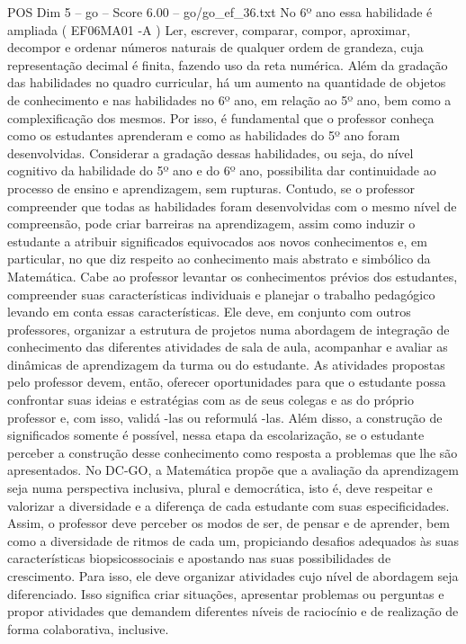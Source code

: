 \begin{textsample}{POS Dim 5 – go – Score 6.00 – go/go\_ef\_36.txt}
No 6º ano essa habilidade é ampliada ( EF06MA01 -A ) Ler, escrever, comparar, compor, aproximar, decompor e ordenar números naturais de qualquer ordem de grandeza, cuja representação decimal é finita, fazendo uso da reta numérica.
Além da gradação das habilidades no quadro curricular, há um aumento na quantidade de objetos de conhecimento e nas habilidades no 6º ano, em relação ao 5º ano, bem como a complexificação dos mesmos.
Por isso, é fundamental que o professor conheça como os estudantes aprenderam e como as habilidades do 5º ano foram desenvolvidas.
Considerar a gradação dessas habilidades, ou seja, do nível cognitivo da habilidade do 5º ano e do 6º ano, possibilita dar continuidade ao processo de ensino e aprendizagem, sem rupturas.
Contudo, se o professor compreender que todas as habilidades foram desenvolvidas com o mesmo nível de compreensão, pode criar barreiras na aprendizagem, assim como induzir o estudante a atribuir significados equivocados aos novos conhecimentos e, em particular, no que diz respeito ao conhecimento mais abstrato e simbólico da Matemática.
Cabe ao professor levantar os conhecimentos prévios dos estudantes, compreender suas características individuais e planejar o trabalho pedagógico levando em conta essas características.
Ele deve, em conjunto com outros professores, organizar a estrutura de projetos numa abordagem de integração de conhecimento das diferentes atividades de sala de aula, acompanhar e avaliar as dinâmicas de aprendizagem da turma ou do estudante.
As atividades propostas pelo professor devem, então, oferecer oportunidades para que o estudante possa confrontar suas ideias e estratégias com as de seus colegas e as do próprio professor e, com isso, validá -las ou reformulá -las.
Além disso, a construção de significados somente é possível, nessa etapa da escolarização, se o estudante perceber a construção desse conhecimento como resposta a problemas que lhe são apresentados.
No DC-GO, a Matemática propõe que a avaliação da aprendizagem seja numa perspectiva inclusiva, plural e democrática, isto é, deve respeitar e valorizar a diversidade e a diferença de cada estudante com suas especificidades.
Assim, o professor deve perceber os modos de ser, de pensar e de aprender, bem como a diversidade de ritmos de cada um, propiciando desafios adequados às suas características biopsicossociais e apostando nas suas possibilidades de crescimento.
Para isso, ele deve organizar atividades cujo nível de abordagem seja diferenciado.
Isso significa criar situações, apresentar problemas ou perguntas e propor atividades que demandem diferentes níveis de raciocínio e de realização de forma colaborativa, inclusive.

\end{textsample}
